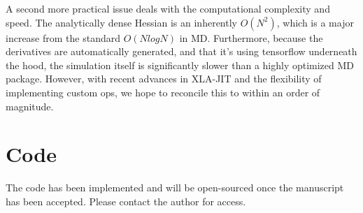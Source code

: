 \documentclass{article}
\begin{document}
A second more practical issue deals with the computational complexity and speed. The analytically dense Hessian is an inherently $O(N^2)$, which is a major increase from the standard $O(N log N)$ in MD. Furthermore, because the derivatives are automatically generated, and that it's using tensorflow underneath the hood, the simulation itself is significantly slower than a highly optimized MD package. However, with recent advances in XLA-JIT and the flexibility of implementing custom ops, we hope to reconcile this to within an order of magnitude.

\section{Code}

The code has been implemented and will be open-sourced once the manuscript has been accepted. Please contact the author for access.
\end{document}
